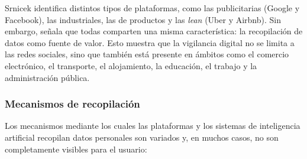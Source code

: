 \documentclass[11pt,a4paper]{article}
\begin{document}
Srnicek identifica distintos tipos de plataformas, como las publicitarias (Google y Facebook), las industriales, las de productos y las \textit{lean} (Uber y Airbnb). Sin embargo, señala que todas comparten una misma característica: la recopilación de datos como fuente de valor. Esto muestra que la vigilancia digital no se limita a las redes sociales, sino que también está presente en ámbitos como el comercio electrónico, el transporte, el alojamiento, la educación, el trabajo y la administración pública.

\subsubsection{Mecanismos de recopilación}

Los mecanismos mediante los cuales las plataformas y los sistemas de inteligencia artificial recopilan datos personales son variados y, en muchos casos, no son completamente visibles para el usuario:
\end{document}
